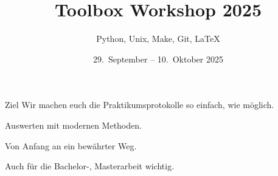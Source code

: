 

\title[Toolbox 2024]{Toolbox Workshop 2025}
\subtitle{Python, Unix, Make, Git, \LaTeX{}}
\date{29.~September – 10.~Oktober 2025}
\author[Toolbox Workshop Team]{}



\maketitle

\begin{frame}{Ziel}
  \setlength\parskip{3ex}
  \huge
  Wir machen euch die Praktikumsprotokolle so einfach, wie möglich.

  Auswerten mit modernen Methoden.

  Von Anfang an ein bewährter Weg.

  Auch für die Bachelor-, Masterarbeit wichtig.
\end{frame}

